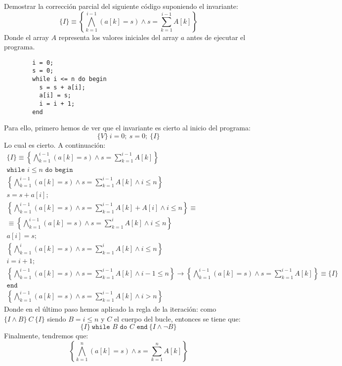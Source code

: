 \begin{ejercicio}
    Demostrar la corrección parcial del siguiente código
    suponiendo el invariante:
    \begin{equation*}
        \{I\} \equiv \left\{\bigwedge_{k=1}^{i-1}(a[k] = s) \land s = \sum_{k=1}^{i-1} A[k]\right\}
    \end{equation*}
    Donde el array $A$ representa los valores iniciales del array $a$ antes de ejecutar el programa.
    \begin{verbatim}
        i = 0;
        s = 0;
        while i <= n do begin
          s = s + a[i];
          a[i] = s;
          i = i + 1;
        end
    \end{verbatim}

    Para ello, primero hemos de ver que el invariante es cierto al inicio del programa:
    \begin{equation*}
        \{V\}\ i=0;\ s=0;\ \{I\}
    \end{equation*}
    Lo cual es cierto. A continuación:
    \begin{gather*}
        \{I\} \equiv \left\{\bigwedge_{k=1}^{i-1}(a[k]=s) \land s = \sum_{k=1}^{i-1}A[k]\right\} \\
        \texttt{while\ } i\leq n \texttt{\ do\ begin} \\
        \left\{\bigwedge_{k=1}^{i-1}(a[k]=s) \land s = \sum_{k=1}^{i-1}A[k] \land i \leq n\right\} \\
        s = s + a[i]; \\
        \left\{\bigwedge_{k=1}^{i-1}(a[k]=s) \land s = \sum_{k=1}^{i-1}A[k] + A[i] \land i \leq n\right\} \equiv \\ \equiv  \left\{\bigwedge_{k=1}^{i-1}(a[k]=s) \land s = \sum_{k=1}^{i}A[k] \land i \leq n\right\} \\
        a[i] = s; \\
        \left\{\bigwedge_{k=1}^{i}(a[k]=s) \land s = \sum_{k=1}^{i}A[k] \land i \leq n\right\} \\
        i = i + 1; \\
        \left\{\bigwedge_{k=1}^{i-1}(a[k]=s) \land s = \sum_{k=1}^{i-1}A[k] \land i-1 \leq n\right\} \rightarrow \left\{\bigwedge_{k=1}^{i-1}(a[k]=s) \land s = \sum_{k=1}^{i-1}A[k] \right\} \equiv \{I\} \\
        \texttt{end} \\
\left\{\bigwedge_{k=1}^{i-1}(a[k]=s) \land s = \sum_{k=1}^{i-1}A[k] \land i > n \right\} 
    \end{gather*}
    Donde en el último paso hemos aplicado la regla de la iteración: como $\{I\land B\}\ C\ \{I\}$ siendo $B = i\leq n$ y $C$ el cuerpo del bucle, entonces se tiene que:
    \begin{equation*}
        \{I\}\ \texttt{while\ } B\texttt{\ do\ } C \texttt{\ end}\ \{I \land \lnot B\}
    \end{equation*}
    Finalmente, tendremos que:
    \begin{equation*}
        \left\{\bigwedge_{k=1}^{n}(a[k]=s) \land s = \sum_{k=1}^{n}A[k]\right\}
    \end{equation*}
\end{ejercicio}

